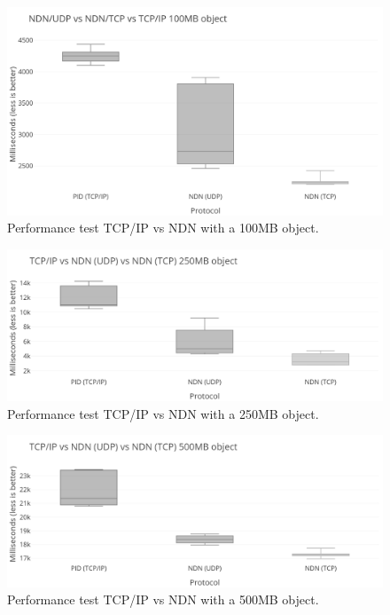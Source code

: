 \begin{figure}[H]
\centering
\includegraphics[scale=0.43]{Images/bench100MB_grey.png}
\caption{Performance test TCP/IP vs NDN with a 100MB object.}
\label{fig:perftest-2}
\end{figure}

\begin{figure}[H]
\centering
\includegraphics[scale=0.43]{Images/ndn_tcpip_250_grey.png}
\caption{Performance test TCP/IP vs NDN with a 250MB object.}
\label{fig:perftest-3}
\end{figure}

\begin{figure}[H]
\centering
\includegraphics[scale=0.43]{Images/ndn_tcpip_500_grey.png}
\caption{Performance test TCP/IP vs NDN with a 500MB object.}
\label{fig:perftest-4}
\end{figure}

